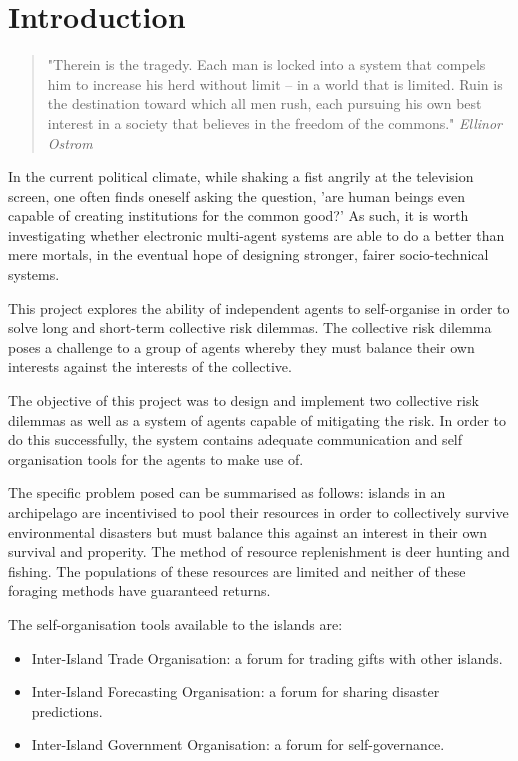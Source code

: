 \chapter{Introduction}

\begin{flushleft}
\begin{quote}
    "Therein is the tragedy. Each man is locked into a system that compels him to increase his herd without limit – in a world that is limited. Ruin is the destination toward which all men rush, each pursuing his own best interest in a society that believes in the freedom of the commons."
    \linebreak
    \emph{Ellinor Ostrom}
\end{quote}
\end{flushleft}

In the current political climate, while shaking a fist angrily at the television screen, one often finds oneself asking the question, 'are human beings even capable of creating institutions for the common good?' As such, it is worth investigating whether electronic multi-agent systems are able to do a better than mere mortals, in the eventual hope of designing stronger, fairer socio-technical systems.

This project explores the ability of independent agents to self-organise in order to solve long and short-term collective risk dilemmas. The collective risk dilemma poses a challenge to a group of agents whereby they must balance their own interests against the interests of the collective. 

The objective of this project was to design and implement two collective risk dilemmas as well as a system of agents capable of mitigating the risk. In order to do this successfully, the system contains adequate communication and self organisation tools for the agents to make use of.

The specific problem posed can be summarised as follows: islands in an archipelago are incentivised to pool their resources in order to collectively survive environmental disasters but must balance this against an interest in their own survival and properity. The method of resource replenishment is deer hunting and fishing. The populations of these resources are limited and neither of these foraging methods have guaranteed returns. 

The self-organisation tools available to the islands are:

\begin{itemize}
    \item Inter-Island Trade Organisation: a forum for trading gifts with other islands.
    \item Inter-Island Forecasting Organisation: a forum for sharing disaster predictions.
    \item Inter-Island Government Organisation: a forum for self-governance.
\end{itemize}